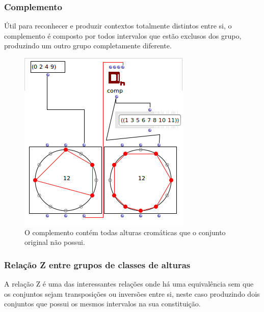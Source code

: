 \documentclass[
	12pt,				%
	openright,			%
	twoside,			%
	a4paper,			%
	english,			%
	french,				%
	spanish,			%
	brazil				%
	]{abntex2}
\begin{document}
\subsubsection{Complemento}

Útil para reconhecer e produzir contextos totalmente distintos entre si, o complemento é composto por todos intervalos que estão exclusos dos grupo, produzindo um outro grupo completamente diferente.


\begin{figure}[!h]
	\caption{\label{fig_grafico}O complemento contém todas alturas cromáticas que o conjunto original não possui. }
	\begin{center}
	    \includegraphics[scale=0.6]{OM_settheory/complemento.png}
	\end{center}
\end{figure}


\subsubsection{Relação Z entre grupos de classes de alturas}

A relação Z é uma das interessantes relações onde há uma equivalência sem que os conjuntos sejam transposições ou inversões entre si, neste caso produzindo dois conjuntos que possui os mesmos intervalos na sua constituição.
\end{document}
